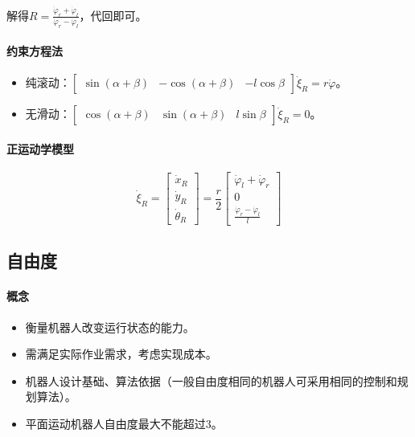 \documentclass[
12pt, %
a4paper, 
oneside, %
headinclude,footinclude, %
]{scrartcl}
\begin{document}
解得$ R = \frac{\dot{\varphi}_r + \dot{\varphi}_l}{\dot{\varphi}_r - \dot{\varphi}_l} $，代回即可。
\paragraph{约束方程法}
\begin{itemize}
\item 纯滚动：$ \begin{bmatrix} \sin(\alpha + \beta) & -\cos(\alpha + \beta) & -l\cos\beta \end{bmatrix} \dot{\xi}_R = r\dot{\varphi} $。
\item 无滑动：$ \begin{bmatrix} \cos(\alpha + \beta) & \sin(\alpha + \beta) & l\sin\beta \end{bmatrix} \dot{\xi}_R = 0 $。
\end{itemize}
\paragraph{正运动学模型}
$$ \dot{\xi}_R = \begin{bmatrix} \dot{x}_R \\ \dot{y}_R \\ \dot{\theta}_R \end{bmatrix} = \frac{r}{2} \begin{bmatrix} \dot{\varphi}_l + \dot{\varphi}_r \\ 0 \\ \frac{\dot{\varphi}_r - \dot{\varphi}_l}{l} \end{bmatrix} $$
\subsection[自由度]{自由度}
\paragraph{概念}
\begin{itemize}
\item 衡量机器人改变运行状态的能力。
\item 需满足实际作业需求，考虑实现成本。
\item 机器人设计基础、算法依据（一般自由度相同的机器人可采用相同的控制和规划算法）。
\item 平面运动机器人自由度最大不能超过$ 3 $。
\end{itemize}
\end{document}
